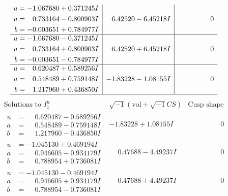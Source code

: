 \documentclass[1p]{elsarticle_modified}
\theoremstyle{definition}
\newcommand{\I}{\sqrt{-1}}
\begin{document}
$$\begin{array}{c|c|c}
\begin{aligned}
u &= -1.067680 + 0.371245 I \\
a &= \phantom{-}0.733164 - 0.800903 I \\
b &= -0.003651 + 0.784977 I\end{aligned}
 & \phantom{-}6.42520 - 6.45218 I & \phantom{-0.000000 } 0 \\ \hline\begin{aligned}
u &= -1.067680 - 0.371245 I \\
a &= \phantom{-}0.733164 + 0.800903 I \\
b &= -0.003651 - 0.784977 I\end{aligned}
 & \phantom{-}6.42520 + 6.45218 I & \phantom{-0.000000 } 0 \\ \hline\begin{aligned}
u &= \phantom{-}0.620487 + 0.589256 I \\
a &= \phantom{-}0.548489 + 0.759148 I \\
b &= \phantom{-}1.217960 + 0.436850 I\end{aligned}
 & -1.83228 - 1.08155 I & \phantom{-0.000000 } 0\\
 \hline 
 \end{array}$$\newpage$$\begin{array}{c|c|c}  
\text{Solutions to }I^u_{1}& \I (\text{vol} + \sqrt{-1}CS) & \text{Cusp shape}\\
 \hline 
\begin{aligned}
u &= \phantom{-}0.620487 - 0.589256 I \\
a &= \phantom{-}0.548489 - 0.759148 I \\
b &= \phantom{-}1.217960 - 0.436850 I\end{aligned}
 & -1.83228 + 1.08155 I & \phantom{-0.000000 } 0 \\ \hline\begin{aligned}
u &= -1.045130 + 0.469194 I \\
a &= \phantom{-}0.946605 - 0.934179 I \\
b &= \phantom{-}0.788954 + 0.736081 I\end{aligned}
 & \phantom{-}0.47688 - 4.49237 I & \phantom{-0.000000 } 0 \\ \hline\begin{aligned}
u &= -1.045130 - 0.469194 I \\
a &= \phantom{-}0.946605 + 0.934179 I \\
b &= \phantom{-}0.788954 - 0.736081 I\end{aligned}
 & \phantom{-}0.47688 + 4.49237 I & \phantom{-0.000000 } 0 \\ \hline\begin{aligned}

\end{aligned}
\end{array}$$
\end{document}
